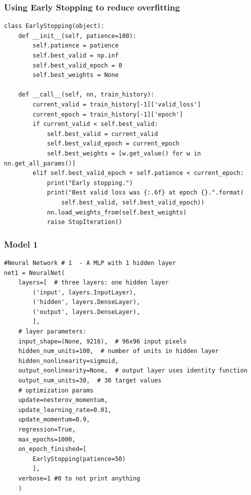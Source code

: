 \documentclass{beamer}
\begin{document}
\begin{frame}[fragile]
\frametitle{Using Early Stopping to reduce overfitting}
\begin{verbatim}
class EarlyStopping(object):
    def __init__(self, patience=100):
        self.patience = patience
        self.best_valid = np.inf
        self.best_valid_epoch = 0
        self.best_weights = None

    def __call__(self, nn, train_history):
        current_valid = train_history[-1]['valid_loss']
        current_epoch = train_history[-1]['epoch']
        if current_valid < self.best_valid:
            self.best_valid = current_valid
            self.best_valid_epoch = current_epoch
            self.best_weights = [w.get_value() for w in nn.get_all_params()]
        elif self.best_valid_epoch + self.patience < current_epoch:
            print("Early stopping.")
            print("Best valid loss was {:.6f} at epoch {}.".format(
                self.best_valid, self.best_valid_epoch))
            nn.load_weights_from(self.best_weights)
            raise StopIteration()
\end{verbatim}
\end{frame}

\begin{frame}[fragile]
\frametitle{Model 1}
\begin{verbatim}
#Neural Network # 1  - A MLP with 1 hidden layer
net1 = NeuralNet(
    layers=[  # three layers: one hidden layer
        ('input', layers.InputLayer),
        ('hidden', layers.DenseLayer),
        ('output', layers.DenseLayer),
        ],
    # layer parameters:
    input_shape=(None, 9216),  # 96x96 input pixels
    hidden_num_units=100,  # number of units in hidden layer
    hidden_nonlinearity=sigmoid,
    output_nonlinearity=None,  # output layer uses identity function
    output_num_units=30,  # 30 target values
    # optimization params
    update=nesterov_momentum,
    update_learning_rate=0.01,
    update_momentum=0.9,
    regression=True, 
    max_epochs=1000,
    on_epoch_finished=[
        EarlyStopping(patience=50)
        ],
    verbose=1 #0 to not print anything
    )
\end{verbatim}
\end{frame}
\end{document}
